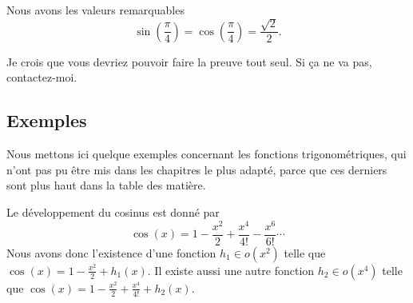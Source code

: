 \begin{lemma}       \label{LEMooIGNPooPEctJy}
    Nous avons les valeurs remarquables
    \begin{equation}
        \sin(\frac{ \pi }{ 4 })=\cos(\frac{ \pi }{ 4 })=\frac{ \sqrt{ 2 } }{2}.
    \end{equation}
\end{lemma}
Je crois que vous devriez pouvoir faire la preuve tout seul. Si ça ne va pas, contactez-moi.

\subsection{Exemples}

Nous mettons ici quelque exemples concernant les fonctions trigonométriques, qui n'ont pas pu être mis dans les chapitres le plus adapté, parce que ces derniers sont plus haut dans la table des matière.

\begin{example}[Taylor]     \label{EXooXLYJooKVqhTE}
	Le développement du cosinus est donné par
	\begin{equation}
		\cos(x)=1-\frac{ x^2 }{ 2 }+\frac{ x^4 }{ 4! }-\frac{ x^6 }{ 6! }\cdots
	\end{equation}
	Nous avons donc l'existence d'une fonction $h_1\in o(x^2)$ telle que $\cos(x)=1-\frac{ x^2 }{ 2 }+h_1(x)$. Il existe aussi une autre fonction $h_2\in o(x^4)$ telle que $\cos(x)=1-\frac{ x^2 }{ 2 }+\frac{ x^4 }{ 4! }+h_2(x)$.
\end{example}

